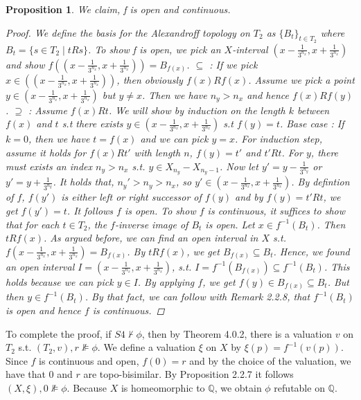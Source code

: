 \documentclass[12pt, a4paper]{scrartcl}
\newtheorem{proposition}[definition]{Proposition}
\begin{document}
\begin{proposition}
    We claim, f is open and continuous.

    \begin{proof}
        We define the basis for the Alexandroff topology on $T_2$ as $\{B_t\}_{t \in T_2}$ where $B_t = \{s \in T_2 \mid tRs\}$.
        To show f is open, we pick an $X$-interval $(x - \frac{1}{3^{n_x}}, x + \frac{1}{3^{n_x}})$ and show 
        $f((x - \frac{1}{3^{n_x}}, x + \frac{1}{3^{n_x}})) = B_{f(x)}$. \newline
        $\subseteq$ : If we pick $x \in ((x - \frac{1}{3^{n_x}}, x + \frac{1}{3^{n_x}}))$, then obviously $f(x)Rf(x)$. Assume we pick a point 
        $y \in (x - \frac{1}{3^{n_x}}, x + \frac{1}{3^{n_x}})$ but $y \neq x$. Then we have $n_y > n_x$ and hence $f(x) R f(y)$.
        $\supseteq$ : Assume $f(x)Rt$. We will show by induction on the length $k$ between $f(x)$ and $t$ s.t there exists $y \in (x - \frac{1}{3^{n_x}}, x + \frac{1}{3^{n_x}})$ s.t $f(y) = t$.
        Base case : If $k = 0$, then we have $t = f(x)$ and we can pick $y = x$. For induction step, assume it holds for $f(x)Rt'$ with length $n$, $f(y) = t'$ and $t'Rt$.
        For $y$, there must exists an index $n_y > n_x$ s.t. $y \in X_{n_y} - X_{n_y -1}$. 
        Now let $y' = y - \frac{1}{3^{n_y}}$ or $y' = y + \frac{1}{3^{n_y}}$. It holds that, $n_y' > n_y > n_x$, so $y' \in (x - \frac{1}{3^{n_x}}, x + \frac{1}{3^{n_x}})$.
        By defintion of $f$, $f(y')$ is either left or right successor of $f(y)$ and by $f(y)= t' R t$, we get $f(y') = t$. It follows $f$ is open. \newline
        To show $f$ is continuous, it suffices to show that for each $t \in T_2$, the $f$-inverse image of $B_t$ is open. Let $x \in f^{-1}(B_t)$. Then $tRf(x)$. As argued before, we can find an open interval in $X$ s.t.
        $f (x - \frac{1}{3^{n_x}}, x + \frac{1}{3^{n_x}}) = B_{f(x)}$.  By $tRf(x)$, we get $B_{f(x)} \subseteq B_t$. Hence, we found an open interval
        $I = (x - \frac{1}{3^{n_x}}, x + \frac{1}{3^{n_x}})$, s.t. $I = f^{-1}(B_{f(x)}) \subseteq f^{-1}(B_t)$. This holds because we can pick $y \in I$. By applying $f$, we get $f(y) \in B_{f(x)} \subseteq B_t$. But then $y \in f^{-1}(B_t)$.
        By that fact, we can follow with Remark 2.2.8, that $f^{-1}(B_t)$ is open and hence $f$ is continuous.

    \end{proof}

\end{proposition}
\clearpage
To complete the proof, if $S4 \nvdash \phi$, then by Theorem 4.0.2, there is a valuation $v$ on $T_2$ s.t. $(T_2, v), r \nVDash \phi$. We define a valuation $\xi$ on $X$ by $\xi(p) = f^{-1}(v(p))$. Since $f$ is continuous and open, $f(0) = r$ and by the choice 
of the valuation, we have that $0$ and $r$ are topo-bisimilar. By Proposition 2.2.7 it follows $(X, \xi), 0 \nVDash \phi$. Because $X$ is homeomorphic to $\mathbb{Q}$, we obtain $\phi$ refutable on $\mathbb{Q}$.
\end{document}
